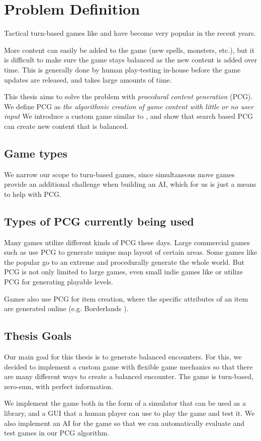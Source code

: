 \chapter{Problem Definition}
\label{chapter01}

Tactical turn-based games like \citet{duelyst} and \citet{faeria} have become
very popular in the recent years.

More content can easily be added to the game (new spells, monsters, etc.),
but it is difficult to make sure the game stays balanced as the new content
is added over time. This is generally done by human play-testing 
in-house before the game updates are released, and takes large amounts of time.

This thesis aims to solve the problem with \emph{procedural content generation}
(PCG)\@. We define PCG as \emph{the algorithmic creation of game content with
little or no user input} \citep{pcgbook} We introduce a custom game similar to
\citet{duelyst}, and show that search based PCG can create new content that is
balanced.

\section{Game types}

We narrow our scope to turn-based games, since simultaneous move games provide
an additional challenge when building an AI, which for us is just a means to help
with PCG.

\section{Types of PCG currently being used}

Many games utilize different kinds of PCG these days. Large commercial games
such as \citet{diablo} use PCG to generate unique map layout of certain areas.
Some games like the popular \citet{minecraft} go to an extreme and procedurally
generate the whole world. But PCG is not only limited to large games, even
small indie games like \citet{spelunky} or \citet{terraria} utilize
PCG for generating playable levels.

Games also use PCG for item creation, where the specific attributes of an item
are generated online (e.g. Borderlands \citet{borderlands}).

\section{Thesis Goals}

Our main goal for this thesis is to generate balanced encounters. For this, we
decided to implement a custom game with flexible game mechanics so that there
are many different ways to create a balanced encounter. The game is turn-based,
zero-sum, with perfect information.  

We implement the game both in the form of a simulator that can be used as a
library, and a GUI that a human player can use to play the game and test it. We
also implement an AI for the game so that we can automatically evaluate and
test games in our PCG algorithm.

